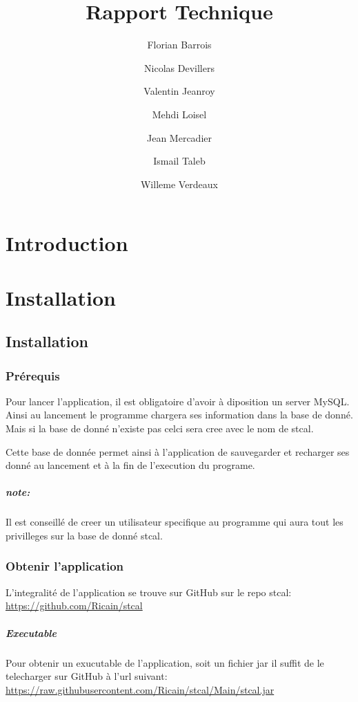 \documentclass[a4paper,10pt]{report}
\title{Rapport Technique}
\author{Florian Barrois \and Nicolas Devillers \and Valentin Jeanroy \and Mehdi Loisel \and Jean Mercadier \and Ismail Taleb \and Willeme Verdeaux}
\begin{document}
\thispagestyle{headings}

\maketitle

\tableofcontents

\chapter*{Introduction}

\chapter{Installation}

	\section{Installation}

		\subsection{Prérequis}

			Pour lancer l'application, il est obligatoire d'avoir à diposition un server MySQL. Ainsi au lancement le programme chargera ses information dans la base de donné. Mais si la base de donné n'existe pas celci sera cree avec le nom de stcal.

			Cette base de donnée permet ainsi à l'application de sauvegarder et recharger ses donné au lancement et à la fin de l'execution du programe.

			\paragraph*{note:}
			Il est conseillé de creer un utilisateur specifique au programme qui aura tout les privilleges sur la base de donné stcal.

		\subsection{Obtenir l'application}

			L'integralité de l'application se trouve sur GitHub sur le repo stcal: \href{https://github.com/Ricain/stcal}{https://github.com/Ricain/stcal}
	
			\paragraph[Binaire]{Executable}
			Pour obtenir un exucutable de l'application, soit un fichier jar il suffit de le telecharger sur GitHub à l'url suivant: \href{https://raw.githubusercontent.com/Ricain/stcal/Main/stcal.jar}{https://raw.githubusercontent.com/Ricain/stcal/Main/stcal.jar}
\end{document}
